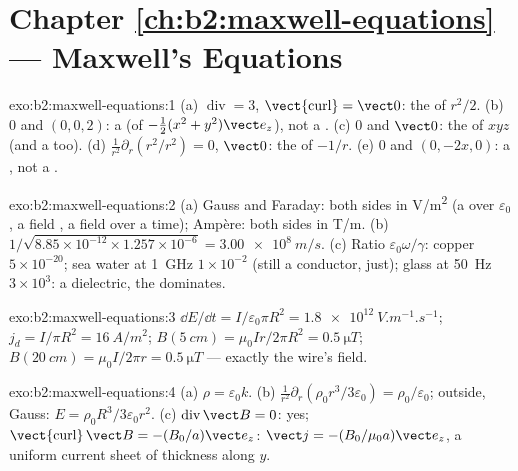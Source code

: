 \section*{Chapter \ref{ch:b2:maxwell-equations} --- Maxwell's Equations}

\begin{solution}{exo:b2:maxwell-equations:1}
(a) $\operatorname{div} = 3$, $\operatorname{\vect{curl}} = \vect 0$: the  of $r^2/2$.
(b) $0$ and $(0, 0, 2)$: a  (of $-\tfrac12(x^2 + y^2)\vect e_z$), not a
. (c) $0$ and $\vect 0$: the  of $xyz$ (and a  too). (d)
$\frac1{r^2}\partial_r(r^2/r^2) = 0$,  $\vect 0$: the  of $-1/r$. (e)
$0$ and $(0, -2x, 0)$: a , not a .
\end{solution}

\begin{solution}{exo:b2:maxwell-equations:2}
(a) Gauss and Faraday: both sides in \unit{V/m^2} (a  over
$\varepsilon_0$, a field , a field over a time); Ampère: both sides in
\unit{T/m}.
(b) $1/\sqrt{8.85 \times 10^{-12} \times 1.257 \times 10^{-6}} = \qty{3.00e8}{m/s}$. (c) Ratio
$\varepsilon_0\omega/\gamma$: copper $5 \times 10^{-20}$; sea water at \qty{1}{GHz} $1 \times 10^{-2}$
(still a conductor, just); glass at \qty{50}{Hz} $3 \times 10^3$: a dielectric,
the  dominates.
\end{solution}

\begin{solution}{exo:b2:maxwell-equations:3}
$\dd E/\dd t = I/\varepsilon_0\pi R^2 = \qty{1.8e12}{V.m^{-1}.s^{-1}}$; $j_d = I/\pi R^2 =
\qty{16}{A/m^2}$; $B(\qty{5}{cm}) = \mu_0Ir/2\pi R^2 = \qty{0.5}{\micro T}$; $B(\qty{20}{cm}) =
\mu_0I/2\pi r = \qty{0.5}{\micro T}$ --- exactly the wire's field.
\end{solution}

\begin{solution}{exo:b2:maxwell-equations:4}
(a) $\rho = \varepsilon_0k$. (b) $\frac1{r^2}\partial_r(\rho_0r^3/3\varepsilon_0) = \rho_0/\varepsilon_0$;
outside, Gauss: $E = \rho_0R^3/3\varepsilon_0r^2$. (c) $\operatorname{div}\vect B = 0$: yes;
$\operatorname{\vect{curl}}\vect B = -(B_0/a)\vect e_z$: $\vect j = -(B_0/\mu_0a)\vect e_z$, a
uniform current sheet of thickness along $y$.
\end{solution}


